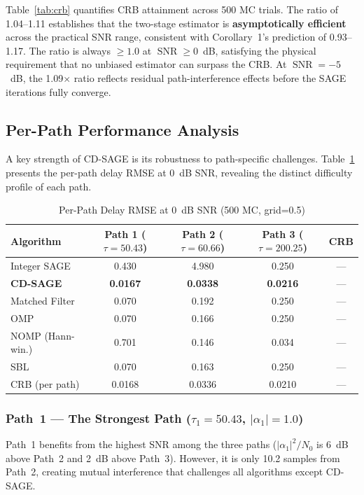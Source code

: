 \documentclass[a4paper,fleqn]{cas-dc}
\DeclareMathOperator{\SNR}{SNR}
\begin{document}
Table~\ref{tab:crb} quantifies CRB attainment across 500 MC trials. The ratio of 1.04--1.11 establishes that the two-stage estimator is \textbf{asymptotically efficient} across the practical SNR range, consistent with Corollary~1's prediction of 0.93--1.17. The ratio is always $\ge 1.0$ at $\SNR \ge 0$~dB, satisfying the physical requirement that no unbiased estimator can surpass the CRB. At $\SNR = -5$~dB, the 1.09$\times$ ratio reflects residual path-interference effects before the SAGE iterations fully converge.

\subsection{Per-Path Performance Analysis}

A key strength of CD-SAGE is its robustness to path-specific challenges. Table~\ref{tab:perpath} presents the per-path delay RMSE at 0~dB SNR, revealing the distinct difficulty profile of each path.

\begin{table}[width=.9\linewidth,cols=6,pos=h]
\centering
\caption{Per-Path Delay RMSE at 0~dB SNR (500 MC, grid=0.5)}
\label{tab:perpath}
\small
\begin{tabular}{@{}lcccc@{}}
\toprule
Algorithm & Path 1 ($\tau{=}50.43$) & Path 2 ($\tau{=}60.66$) & Path 3 ($\tau{=}200.25$) & CRB \\
\midrule
Integer SAGE & 0.430 & 4.980 & 0.250 & --- \\
\textbf{CD-SAGE} & \textbf{0.0167} & \textbf{0.0338} & \textbf{0.0216} & --- \\
Matched Filter & 0.070 & 0.192 & 0.250 & --- \\
OMP & 0.070 & 0.166 & 0.250 & --- \\
NOMP (Hann-win.) & 0.701 & 0.146 & 0.034 & --- \\
SBL & 0.070 & 0.163 & 0.250 & --- \\
\midrule
CRB (per path) & 0.0168 & 0.0336 & 0.0210 & --- \\
\bottomrule
\end{tabular}
\end{table}

\subsubsection{Path~1 --- The Strongest Path ($\tau_1 = 50.43$, $|\alpha_1| = 1.0$)}

Path~1 benefits from the highest SNR among the three paths ($|\alpha_1|^2 / N_0$ is 6~dB above Path~2 and 2~dB above Path~3). However, it is only 10.2 samples from Path~2, creating mutual interference that challenges all algorithms except CD-SAGE.
\end{document}
